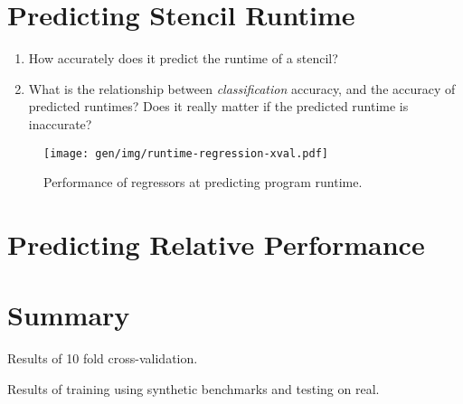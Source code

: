 


\section{Predicting Stencil Runtime}

\begin{enumerate}
\item How accurately does it predict the runtime of a stencil?
\item What is the relationship between \emph{classification} accuracy,
  and the accuracy of predicted runtimes? Does it really matter if the
  predicted runtime is inaccurate?
\end{enumerate}

\begin{figure}
\centering
\texttt{[image: gen/img/runtime-regression-xval.pdf]}
\caption{%
  Performance of regressors at predicting program runtime.%
}
\end{figure}


\section{Predicting Relative Performance}


\section{Summary}

\begin{table}
\scriptsize

\caption{Results of 10 fold cross-validation.}
\end{table}

\begin{table}
\scriptsize

\caption{Results of training using synthetic benchmarks and testing on
  real.}
\end{table}
